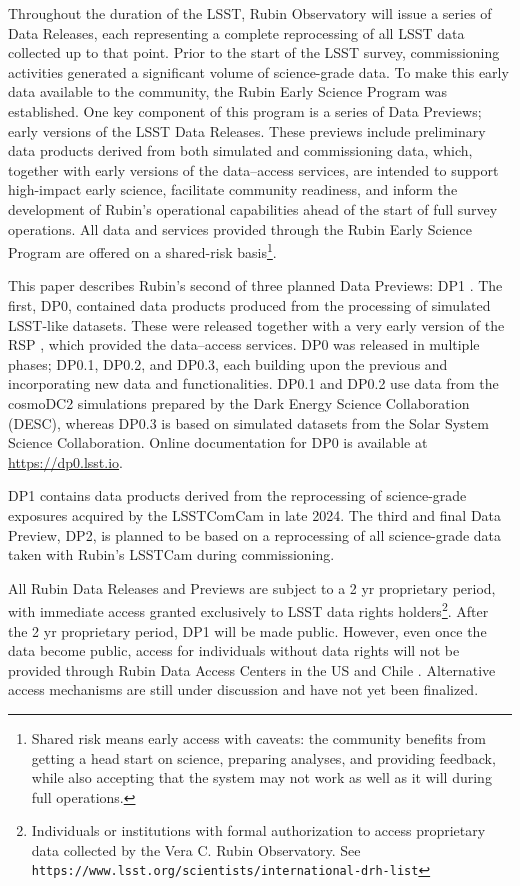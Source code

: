 Throughout the duration of the \gls{LSST},  Rubin Observatory will issue a series of Data Releases, each representing a complete reprocessing of all \gls{LSST} data collected up to that point.
Prior to the start of the \gls{LSST} survey, commissioning activities generated a significant volume of science-grade data.
To make this early data available to the community, the Rubin Early Science Program \citep[][]{RTN-011} was established.
One key component of this program is a series of Data Previews; early versions of the \gls{LSST} Data Releases.
These previews include preliminary data products derived from both simulated and commissioning data, which, together with early versions of the data--access services, are intended to support high-impact early science, facilitate community readiness, and inform the development of Rubin’s operational capabilities ahead of the start of full survey operations.
All data and services provided through the Rubin Early Science Program are offered on a shared-risk basis\footnote{Shared risk means early access with caveats: the community benefits from getting a head start on science, preparing analyses, and providing feedback, while also accepting that the system may not work as well as it will during full operations.}.

This paper describes Rubin's second of three planned Data Previews: \gls{DP1} \citep[][]{10.71929/rubin/2570308}.
The first, \gls{DP0}, contained data products produced from the processing of simulated \gls{LSST}-like datasets.
These were released together with a very early version of the \gls{RSP} \citep[][]{LSE-319}, which provided the data--access services.
\gls{DP0} was released in multiple phases; DP0.1, DP0.2, and DP0.3,  each building upon the previous and incorporating new data and functionalities.
DP0.1 and DP0.2 use data from the cosmoDC2 simulations \citep[][]{2021ApJS..253...31L} prepared by the Dark Energy Science Collaboration (DESC), whereas DP0.3 is based on simulated datasets from the Solar System Science Collaboration.
Online documentation for \gls{DP0} is available at \url{https://dp0.lsst.io}.
 
\gls{DP1} contains data products derived from the reprocessing of science-grade exposures acquired by the \gls{LSSTComCam} in late 2024.
The third and final Data Preview, \gls{DP2}, is planned to be based on a reprocessing of all science-grade data taken with Rubin's \gls{LSSTCam} during commissioning.

All Rubin Data Releases and Previews are subject to a 2 yr proprietary period, with immediate access granted exclusively to LSST data rights holders\footnote{Individuals or institutions with formal authorization to access proprietary data collected by the Vera C. Rubin Observatory. See \nolinkurl{https://www.lsst.org/scientists/international-drh-list}}\citep[][]{rdo-013}.
After the 2 yr proprietary period, \gls{DP1} will be made public. 
However, even once the data become public, access for individuals without data rights will not be provided through Rubin Data Access Centers  in the US and Chile \citep[][]{rdo-013}. 
Alternative access mechanisms are still under discussion and have not yet been finalized.

